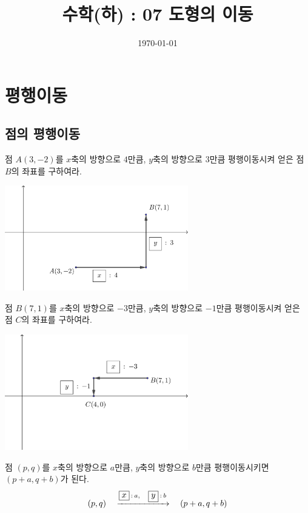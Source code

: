 \documentclass{oblivoir}
\begin{document}
\title{수학(하) : 07 도형의 이동}
\author{}
\date{\today}
\maketitle
\tableofcontents
\newpage

%
\section{평행이동}
\subsection{점의 평행이동}
%
\exam{}\label{translate1}
점 \(A(3,-2)\)를 \(x\)축의 방향으로 \(4\)만큼, \(y\)축의 방향으로 \(3\)만큼 평행이동시켜 얻은 점 \(B\)의 좌표를 구하여라.
\begin{center}
\includegraphics[width=0.6\textwidth]{translate_1}
\end{center}

%
\exam{}\label{translate2}
점 \(B(7,1)\)를 \(x\)축의 방향으로 \(-3\)만큼, \(y\)축의 방향으로 \(-1\)만큼 평행이동시켜 얻은 점 \(C\)의 좌표를 구하여라.
\begin{center}
\includegraphics[width=0.6\textwidth]{translate_2}
\end{center}

\begin{mdframed}
%
\label{translate3}
점 \((p,q)\)를 \(x\)축의 방향으로 \(a\)만큼, \(y\)축의 방향으로 \(b\)만큼 평행이동시키면 \((p+a,q+b)\)가 된다.
\[(p,q)\quad\xrightarrow{\fbox{$x$}\::\:a,\quad\fbox{$y$}\::\:b}\quad (p+a,q+b)\]
\end{mdframed}
\end{document}
